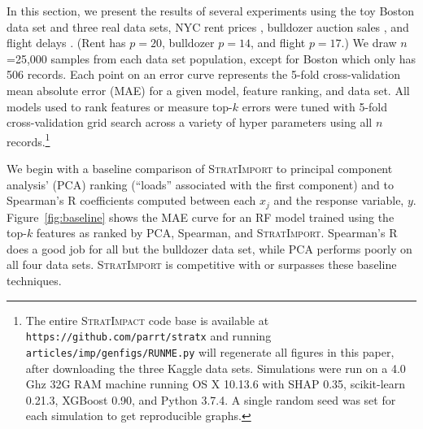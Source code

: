 \documentclass[11pt]{article}
\newcommand{\figref}[1]{Figure~\ref{#1}}
\newcommand{\cut}[1]{}
\newcommand{\simp}{\fontfamily{cmr}\textsc{\small StratImpact}}
\newcommand{\simpo}{\fontfamily{cmr}\textsc{\small StratImport}}
\begin{document}
In this section, we present the results of several experiments using the toy Boston data set and three real data sets, NYC rent prices \citep{rent}, bulldozer auction sales \citep{bulldozer}, and flight delays \citep{flights}. (Rent has $p=20$, bulldozer $p=14$, and flight $p=17$.) We draw $n$=25,000 samples from each data set population, except for Boston which only has 506 records. Each point on an error curve represents the 5-fold cross-validation mean absolute error (MAE) for a given model, feature ranking, and data set. All models used to rank features or measure top-$k$ errors were tuned with 5-fold cross-validation grid search across a variety of hyper parameters using all $n$ records.\footnote{
The entire \simp{} code base is available at {\tt\small https://github.com/parrt/stratx} and running {\tt\small articles/imp/genfigs/RUNME.py} will regenerate all figures in this paper, after downloading the three Kaggle data sets.  Simulations were run on a 4.0 Ghz 32G RAM machine running OS X 10.13.6 with SHAP 0.35, scikit-learn 0.21.3, XGBoost 0.90, and Python 3.7.4. A single random seed was set for each simulation to get reproducible graphs.}

We begin with a baseline comparison of \simpo{} to principal component analysis' (PCA) ranking (``loads'' associated with the first component) and to Spearman's R coefficients computed between each $x_j$ and the response variable, $y$.  \figref{fig:baseline} shows the MAE curve for an RF model trained using the top-$k$ features as ranked by PCA, Spearman, and \simpo. Spearman's R does a good job for all but the bulldozer data set, while PCA performs poorly on all four data sets. \simpo{} is competitive with or surpasses these baseline techniques. 

\cut{
\figref{fig:baseline} also shows the error curve for the features ranked by ordinary least squares (OLS); a feature's score is its $\beta$ coefficient divided by its standard error. (OLS is not applicable to the bulldozer data set because it has many high-cardinality categorical explanatory variables, which would create tens of thousands of dummy variables.) 

OLS curves are similar to \simpo's except for rent in \figref{fig:baseline}(d) and are included as a common reference curve on subsequent graphs.
}
\end{document}
